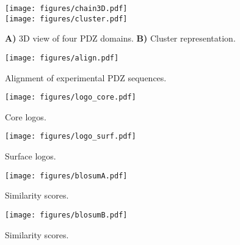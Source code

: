 \documentclass[12pt]{article}
\begin{document}
\begin{figure}[!h]
\begin{center}
\texttt{[image: figures/chain3D.pdf]} \\
\texttt{[image: figures/cluster.pdf]} 
\end{center}
\caption[width=1cm]{{\bf A)} 3D view of four PDZ domains. 
{\bf B)} Cluster representation.}
\label{fig:chain3D} 
\end{figure}


\begin{figure}[!h]
\begin{center}
\vspace*{-2cm}
\texttt{[image: figures/align.pdf]}
\end{center}
\caption[width=1cm]{Alignment of experimental PDZ sequences.}
\label{fig:align} 
\end{figure}

\begin{figure}[!h]
\begin{center}
\vspace*{-2cm}
\texttt{[image: figures/logo\_core.pdf]}
\end{center}
\caption[width=1cm]{Core logos.}
\label{fig:logo_core} 
\end{figure}

\begin{figure}[!h]
\begin{center}
\vspace*{-2cm}
\texttt{[image: figures/logo\_surf.pdf]}
\end{center}
\caption[width=1cm]{Surface logos.}
\label{fig:logo_surf} 
\end{figure}

\begin{figure}[!h]
\begin{center}
\vspace*{-1cm}
\texttt{[image: figures/blosumA.pdf]}
\end{center}
\caption[width=1cm]{Similarity scores.}
\label{fig:blosumA} 
\end{figure}


\begin{figure}[!h]
\begin{center}
\vspace*{-1cm}
\texttt{[image: figures/blosumB.pdf]}
\end{center}
\caption[width=1cm]{Similarity scores.}
\label{fig:blosumB} 
\end{figure}
\end{document}
